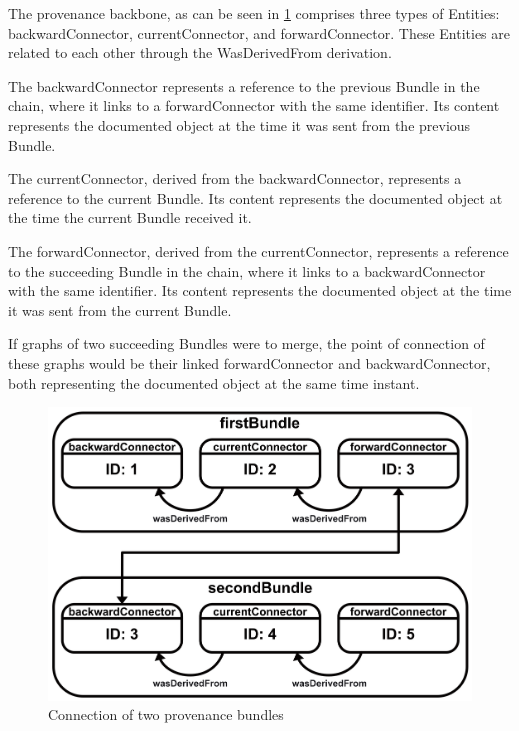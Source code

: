 \documentclass[
  digital,     %
  oneside,     %
  nosansbold,  %
  nocolorbold, %
  lof,         %
  lot,         %
]{fithesis4}
\begin{document}
The provenance backbone, as can be seen in \ref{fig:bundleconnection} comprises three types of Entities: backwardConnector, currentConnector, and forwardConnector. These Entities are related to each other through the WasDerivedFrom derivation. 

The backwardConnector represents a reference to the previous Bundle in the chain, where it links to a forwardConnector with the same identifier. Its content represents the documented object at the time it was sent from the previous Bundle.

The currentConnector, derived from the backwardConnector, represents a reference to the current Bundle. Its content represents the documented object at the time the current Bundle received it.

The forwardConnector, derived from the currentConnector, represents a reference to the succeeding Bundle in the chain, where it links to a backwardConnector with the same identifier. Its content represents the documented object at the time it was sent from the current Bundle.

If graphs of two succeeding Bundles were to merge, the point of connection of these graphs would be their linked forwardConnector and backwardConnector, both representing the documented object at the same time instant.

\begin{figure}[htbp]
  \begin{center}
    \includegraphics[width=12.5cm]{fithesis/images/bundleconnection.png}
  \end{center}
  \caption{Connection of two provenance bundles}
  \label{fig:bundleconnection}
\end{figure}
\end{document}
